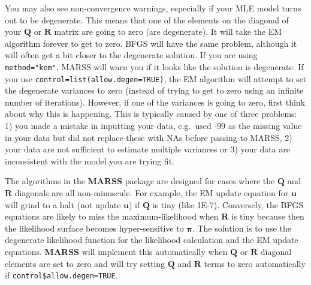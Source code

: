 \documentclass[12pt,]{book}
\begin{document}
You may also see non-convergence warnings, especially if your MLE model turns out to be degenerate. This means that one of the elements on the diagonal of your \(\mathbf{Q}\) or \(\mathbf{R}\) matrix are going to zero (are degenerate). It will take the EM algorithm forever to get to zero. BFGS will have the same problem, although it will often get a bit closer to the degenerate solution. If you are using \texttt{method="kem"}, MARSS will warn you if it looks like the solution is degenerate. If you use \texttt{control=list(allow.degen=TRUE)}, the EM algorithm will attempt to set the degenerate variances to zero (instead of trying to get to zero using an infinite number of iterations). However, if one of the variances is going to zero, first think about why this is happening. This is typically caused by one of three problems: 1) you made a mistake in inputting your data, e.g.~used -99 as the missing value in your data but did not replace these with NAs before passing to MARSS, 2) your data are not sufficient to estimate multiple variances or 3) your data are inconsistent with the model you are trying fit.

The algorithms in the \textbf{MARSS} package are designed for cases where the \(\mathbf{Q}\) and \(\mathbf{R}\) diagonals are all non-minuscule. For example, the EM update equation for \(\mathbf{u}\) will grind to a halt (not update \(\mathbf{u}\)) if \(\mathbf{Q}\) is tiny (like 1E-7). Conversely, the BFGS equations are likely to miss the maximum-likelihood when \(\mathbf{R}\) is tiny because then the likelihood surface becomes hyper-sensitive to \(\boldsymbol{\pi}\). The solution is to use the degenerate likelihood function for the likelihood calculation and the EM update equations. \textbf{MARSS} will implement this automatically when \(\mathbf{Q}\) or \(\mathbf{R}\) diagonal elements are set to zero and will try setting \(\mathbf{Q}\) and \(\mathbf{R}\) terms to zero automatically if \texttt{control\$allow.degen=TRUE}.
\end{document}
